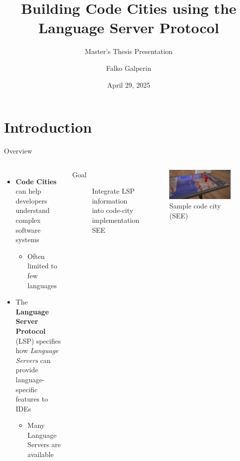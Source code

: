 \documentclass[xcolor={dvipsnames},aspectratio=169,compress,final]{beamer}
\title{Building Code Cities using the Language Server Protocol}
\subtitle{Master's Thesis Presentation}
\author{Falko Galperin}
\institute[Uni Bremen]{%
  Faculty 3---Mathematics \& Computer Science \\
  University of Bremen
}
\date{April 29, 2025}
\newcommand{\follows}{\raisebox{-0.7mm}{\scalebox{1.4}{\textcolor{Maroon}{\ding{43}}}}}
\newcommand{\answer}[1]{\begin{description}\item[\follows{}]{#1}\end{description}}
\begin{document}
{
\begin{frame}
	\titlepage
\end{frame}
}

\section{Introduction}


\begin{frame}{Overview}
	\begin{columns}
		\begin{itemize}
			\item \textbf{Code Cities} can help developers understand complex software systems
			      \begin{itemize}
				      \item Often limited to few languages
			      \end{itemize}
			\item The \textbf{Language Server Protocol} (LSP) specifies how \emph{Language Servers} can provide language-specific features to IDEs
			      \begin{itemize}
				      \item Many Language Servers are available
			      \end{itemize}
		\end{itemize}
		\begin{block}{Goal}
			\answer{Integrate LSP information into code-city implementation SEE}
		\end{block}

		\begin{figure}
			\begin{center}
				\includegraphics[width=0.95\textwidth,clip,trim={11cm 0 13cm 0}]{figures/SEE_screenshot}
			\end{center}
			\caption{Sample code city (SEE)}
		\end{figure}


\end{columns}
\end{frame}
\end{document}
